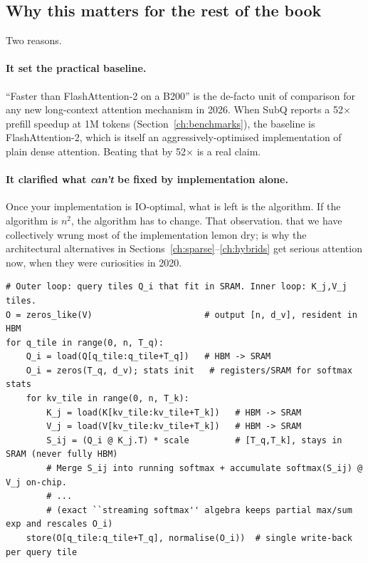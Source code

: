 
\subsection{Why this matters for the rest of the book}

Two reasons.

\paragraph{It set the practical baseline.} ``Faster than FlashAttention-2 on
a B200'' is the de-facto unit of comparison for any new long-context
attention mechanism in 2026. When SubQ reports a 52$\times$ prefill
speedup at 1M tokens (Section~\ref{ch:benchmarks}), the baseline is
FlashAttention-2, which is itself an aggressively-optimised implementation
of plain dense attention. Beating that by 52$\times$ is a real claim.

\paragraph{It clarified what \emph{can't} be fixed by implementation alone.}
Once your implementation is IO-optimal, what is left is the algorithm. If
the algorithm is \(n^2\), the algorithm has to change. That observation.
that we have collectively wrung most of the implementation lemon dry; is
why the architectural alternatives in Sections~\ref{ch:sparse}--\ref{ch:hybrids} get serious attention now,
when they were curiosities in 2020.

\begin{lstlisting}[caption={FlashAttention-1 idea: tiled streaming softmax so no full \(n\times n\) score matrix materialises in \textsc{hbm}; FA-2/FA-3 refine warp scheduling and Hopper overlaps (paragraph below).}]
# Outer loop: query tiles Q_i that fit in SRAM. Inner loop: K_j,V_j tiles.
O = zeros_like(V)                      # output [n, d_v], resident in HBM
for q_tile in range(0, n, T_q):
    Q_i = load(Q[q_tile:q_tile+T_q])   # HBM -> SRAM
    O_i = zeros(T_q, d_v); stats init   # registers/SRAM for softmax stats
    for kv_tile in range(0, n, T_k):
        K_j = load(K[kv_tile:kv_tile+T_k])   # HBM -> SRAM
        V_j = load(V[kv_tile:kv_tile+T_k])   # HBM -> SRAM
        S_ij = (Q_i @ K_j.T) * scale         # [T_q,T_k], stays in SRAM (never fully HBM)
        # Merge S_ij into running softmax + accumulate softmax(S_ij) @ V_j on-chip.
        # ...
        # (exact ``streaming softmax'' algebra keeps partial max/sum exp and rescales O_i)
    store(O[q_tile:q_tile+T_q], normalise(O_i))  # single write-back per query tile
\end{lstlisting}

